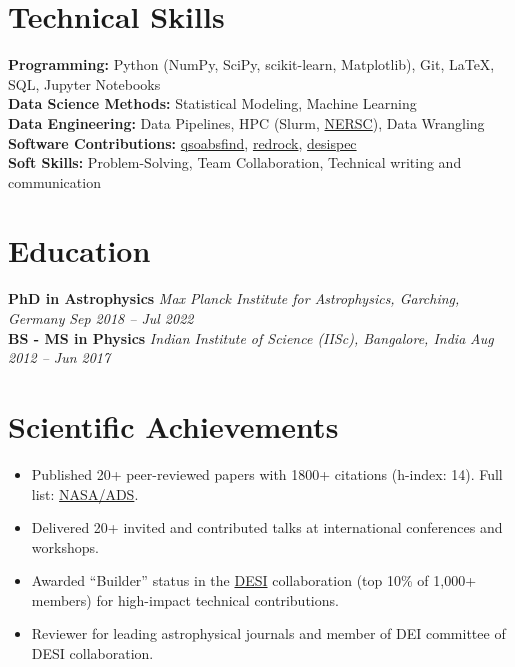 \documentclass[a4paper,10pt]{article}
\begin{document}
\vspace{-2mm}
\section*{Technical Skills}
\textbf{Programming:} Python (NumPy, SciPy, scikit-learn, Matplotlib), Git, LaTeX, SQL, Jupyter Notebooks \\
\textbf{Data Science Methods:} Statistical Modeling, Machine Learning\\
\textbf{Data Engineering:} Data Pipelines, HPC (Slurm, \href{https://www.nersc.gov}{NERSC}), Data Wrangling\\
\textbf{Software Contributions:} \href{https://github.com/abhi0395/qsoabsfind}{qsoabsfind}, \href{https://github.com/desihub/redrock}{redrock}, \href{https://github.com/desihub/desispec}{desispec}\\
\textbf{Soft Skills:} Problem-Solving, Team Collaboration, Technical writing and communication
\vspace*{-2mm}

\section*{Education}

\textbf{PhD in Astrophysics} \hfill \textit{Max Planck Institute for Astrophysics, Garching, Germany} \hfill \textit{Sep 2018 – Jul 2022}\\
\textbf{BS - MS in Physics} \hfill \textit{Indian Institute of Science (IISc), Bangalore, India} \hfill \textit{Aug 2012 – Jun 2017}
\vspace*{-2mm}

\section*{Scientific Achievements}
\begin{itemize}
    \item Published 20+ peer-reviewed papers with 1800+ citations (h-index: 14). Full list: \href{https://ui.adsabs.harvard.edu/public-libraries/YPXGQEsNQg-zR9R9YBYFXw}{NASA/ADS}.
    \item Delivered 20+ invited and contributed talks at international conferences and workshops.
    \item Awarded “Builder” status in the \href{https://en.wikipedia.org/wiki/Dark_Energy_Spectroscopic_Instrument}{DESI} collaboration (top 10\% of 1,000+ members) for high-impact technical contributions.
    \item Reviewer for leading astrophysical journals and member of DEI committee of DESI collaboration.
\end{itemize}
\end{document}
